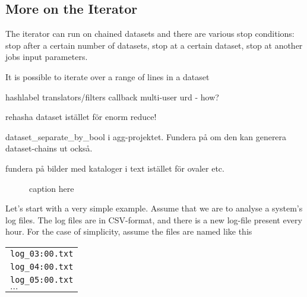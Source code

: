 \documentclass[a4paper]{article}
\begin{document}
\subsection{More on the Iterator}
The iterator can run on chained datasets and there are various stop
conditions: stop after a certain number of datasets, stop at a certain
dataset, stop at another jobs input parameters.

It is possible to iterate over a range of lines in a dataset

hashlabel
translators/filters
callback
multi-user
urd - how?

rehasha dataset istället för enorm reduce!


dataset\_separate\_by\_bool i agg-projektet.  Fundera på om den kan
generera dataset-chains ut också.

fundera på bilder med kataloger i text istället för ovaler etc.

\clearpage

\begin{figure}[h!]
  \begin{center}
    
    \caption{caption here}
    \label{fig:dep_dataset_csvimport_chain}
  \end{center}
\end{figure}






Let's start with a very simple example.  Assume that we are to analyse
a system's log files.  The log files are in CSV-format, and there is a
new log-file present every hour.  For the case of simplicity, assume
the files are named like this

\begin{tabular}{l}
  \texttt{log\_03:00.txt}\\
  \texttt{log\_04:00.txt}\\
  \texttt{log\_05:00.txt}\\
  $\dots$
\end{tabular}
\end{document}
